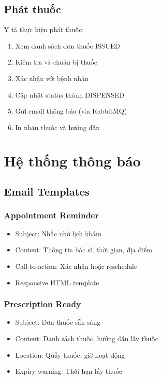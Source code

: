 \documentclass[12pt,a4paper]{report}
\begin{document}
\subsection{Phát thuốc}
Y tá thực hiện phát thuốc:
\begin{enumerate}
    \item Xem danh sách đơn thuốc ISSUED
    \item Kiểm tra và chuẩn bị thuốc
    \item Xác nhận với bệnh nhân
    \item Cập nhật status thành DISPENSED
    \item Gửi email thông báo (via RabbitMQ)
    \item In nhãn thuốc và hướng dẫn
\end{enumerate}

\section{Hệ thống thông báo}

\subsection{Email Templates}
\subsubsection{Appointment Reminder}
\begin{itemize}
    \item Subject: Nhắc nhở lịch khám
    \item Content: Thông tin bác sĩ, thời gian, địa điểm
    \item Call-to-action: Xác nhận hoặc reschedule
    \item Responsive HTML template
\end{itemize}

\subsubsection{Prescription Ready}
\begin{itemize}
    \item Subject: Đơn thuốc sẵn sàng
    \item Content: Danh sách thuốc, hướng dẫn lấy thuốc
    \item Location: Quầy thuốc, giờ hoạt động
    \item Expiry warning: Thời hạn lấy thuốc
\end{itemize}
\end{document}
